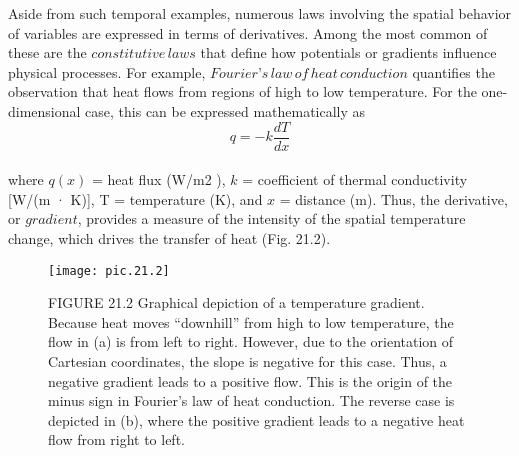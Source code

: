 Aside from such temporal examples, numerous laws involving the spatial behavior of
variables are expressed in terms of derivatives. Among the most common of these are the
$constitutive \, laws$ that define how potentials or gradients influence physical processes. For
example, $Fourier’s \, law \, of \, heat \, conduction$ quantifies the observation that heat flows from
regions of high to low temperature. For the one-dimensional case, this can be expressed
mathematically as
\begin{equation}
	\tag{21.11}
	q = -k \dfrac{dT}{dx}
\end{equation}\\
where $q (x)$ = heat flux (W/m2
), $k$ = coefficient of thermal conductivity [W/(m · K)], T =
temperature (K), and $x$ = distance (m). Thus, the derivative, or $gradient$, provides a measure
of the intensity of the spatial temperature change, which drives the transfer of heat (Fig. 21.2).
\pagebreak
\begin{figure}[hbt!]
	\centering
	\texttt{[image: pic.21.2]}
	\caption{\textsf{FIGURE 21.2
Graphical depiction of a temperature gradient. Because heat moves “downhill” from high to low
temperature, the flow in (a) is from left to right. However, due to the orientation of Cartesian
coordinates, the slope is negative for this case. Thus, a negative gradient leads to a positive
flow. This is the origin of the minus sign in Fourier’s law of heat conduction. The reverse case is
depicted in (b), where the positive gradient leads to a negative heat flow from right to left.}} \hline
	\label{pic.21.2}
\end{figure}\\
